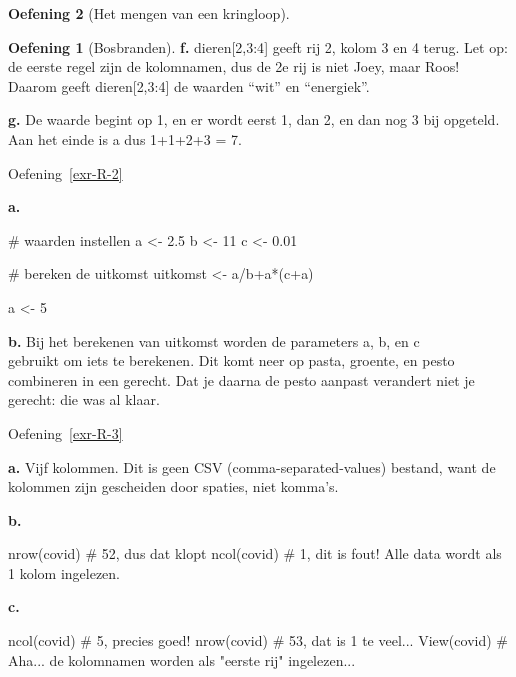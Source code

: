 \documentclass[
  a4paper,
]{scrbook}
\newenvironment{Shaded}{\begin{snugshade}}{\end{snugshade}}
\newcommand{\CommentTok}[1]{\textcolor[rgb]{0.37,0.37,0.37}{#1}}
\newcommand{\DecValTok}[1]{\textcolor[rgb]{0.68,0.00,0.00}{#1}}
\newcommand{\FloatTok}[1]{\textcolor[rgb]{0.68,0.00,0.00}{#1}}
\newcommand{\FunctionTok}[1]{\textcolor[rgb]{0.28,0.35,0.67}{#1}}
\newcommand{\NormalTok}[1]{\textcolor[rgb]{0.00,0.23,0.31}{#1}}
\newcommand{\OtherTok}[1]{\textcolor[rgb]{0.00,0.23,0.31}{#1}}
\newcommand{\SpecialCharTok}[1]{\textcolor[rgb]{0.37,0.37,0.37}{#1}}
\theoremstyle{definition}
\newtheorem{exercise}{Oefening}[chapter]
\theoremstyle{remark}
\begin{document}
\begin{exercise}[Het mengen van een
kringloop]
\begin{exercise}[Bosbranden]
\textbf{f.} dieren{[}2,3:4{]} geeft rij 2, kolom 3 en 4 terug. Let op:
de eerste regel zijn de kolomnamen, dus de 2e rij is niet Joey, maar
Roos! Daarom geeft dieren{[}2,3:4{]} de waarden ``wit'' en ``energiek''.

\textbf{g.} De waarde begint op 1, en er wordt eerst 1, dan 2, en dan
nog 3 bij opgeteld. Aan het einde is a dus 1+1+2+3 = 7.

Oefening~\ref{exr-R-2}

\textbf{a.}

\begin{Shaded}
\begin{Highlighting}[]
\CommentTok{\# waarden instellen}
\NormalTok{a }\OtherTok{\textless{}{-}} \FloatTok{2.5}
\NormalTok{b }\OtherTok{\textless{}{-}} \DecValTok{11}
\NormalTok{c }\OtherTok{\textless{}{-}} \FloatTok{0.01}

\CommentTok{\# bereken de uitkomst}
\NormalTok{uitkomst }\OtherTok{\textless{}{-}}\NormalTok{ a}\SpecialCharTok{/}\NormalTok{b}\SpecialCharTok{+}\NormalTok{a}\SpecialCharTok{*}\NormalTok{(c}\SpecialCharTok{+}\NormalTok{a)}

\NormalTok{a }\OtherTok{\textless{}{-}} \DecValTok{5}
\end{Highlighting}
\end{Shaded}

\textbf{b.} Bij het berekenen van uitkomst worden de parameters a, b, en
c\\
gebruikt om iets te berekenen. Dit komt neer op pasta, groente, en pesto
combineren in een gerecht. Dat je daarna de pesto aanpast verandert niet
je gerecht: die was al klaar.

Oefening~\ref{exr-R-3}

\textbf{a.} Vijf kolommen. Dit is geen CSV (comma-separated-values)
bestand, want de kolommen zijn gescheiden door spaties, niet komma's.

\textbf{b.}

\begin{Shaded}
\begin{Highlighting}[]
\FunctionTok{nrow}\NormalTok{(covid) }\CommentTok{\# 52, dus dat klopt}
\FunctionTok{ncol}\NormalTok{(covid) }\CommentTok{\# 1, dit is fout! Alle data wordt als 1 kolom ingelezen.}
\end{Highlighting}
\end{Shaded}

\textbf{c.}

\begin{Shaded}
\begin{Highlighting}[]
\FunctionTok{ncol}\NormalTok{(covid) }\CommentTok{\# 5, precies goed!}
\FunctionTok{nrow}\NormalTok{(covid) }\CommentTok{\# 53, dat is 1 te veel... }
\FunctionTok{View}\NormalTok{(covid) }\CommentTok{\# Aha... de kolomnamen worden als "eerste rij" ingelezen...}
\end{Highlighting}
\end{Shaded}


\end{exercise}
\end{exercise}
\end{document}
